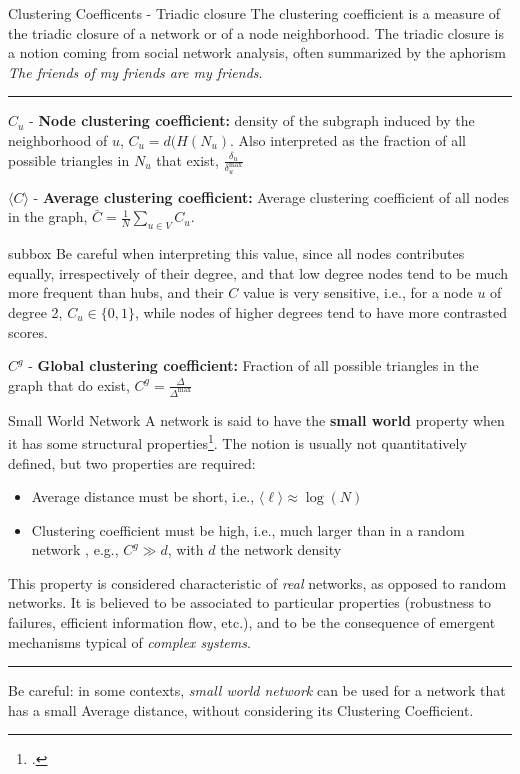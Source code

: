 \begin{textbox}{Clustering Coefficents - Triadic closure}
    The clustering coefficient is a measure of the triadic closure of a network or of a node neighborhood. The triadic closure is a notion coming from social network analysis, often summarized by the aphorism \textit{The friends of my friends are my friends}.

    \noindent\rule{4cm}{0.1pt}

    $C_u$ - \textbf{Node clustering coefficient:} density of the subgraph induced by the neighborhood of $u$, $C_u = d(H(N_u)$. Also interpreted as the fraction of all possible triangles in $N_u$ that exist, $\frac{\delta_u}{\delta^{\max}_u}$

    $\langle C \rangle$ - \textbf{Average clustering coefficient:} Average clustering coefficient of all nodes in the graph, $\bar C = \frac{1}{N}\sum_{u \in V} C_u$.\\

    \begin{subbox}{subbox}{}
        \tiny{Be careful when interpreting this value, since all nodes contributes equally, irrespectively of their degree, and that low degree nodes tend to be much more frequent than hubs, and their $C$ value is very sensitive, i.e., for a node $u$ of degree 2, $C_u \in \{0,1\}$, while nodes of higher degrees tend to have more contrasted scores.}
    \end{subbox}

    $C^g$ - \textbf{Global clustering coefficient:} Fraction of all possible triangles in the graph that do exist, $C^g= \frac{\Delta}{\Delta^{\max}} $
\end{textbox}


\begin{textbox}{Small World Network}
    A network is said to have the \textbf{small world} property when it has some structural properties\footcite{watts1998collective}. The notion is usually not quantitatively defined, but two properties are required:
    \begin{itemize}
        \item Average distance must be short, i.e., $\langle\ell\rangle \approx \log(N)$
        \item Clustering coefficient must be high, i.e., much larger than in a random network , e.g., $C^g \gg d$, with $d$ the network density
    \end{itemize}

    This property is considered characteristic of \textit{real} networks, as opposed to random networks. It is believed to be associated to particular properties (robustness to failures, efficient information flow, etc.), and to be the consequence of emergent mechanisms typical of \textit{complex systems}.

    \noindent\rule{4cm}{0.1pt}

    Be careful: in some contexts, \textit{small world network} can be used for a network that has a small Average distance, without considering its Clustering Coefficient.
\end{textbox}


